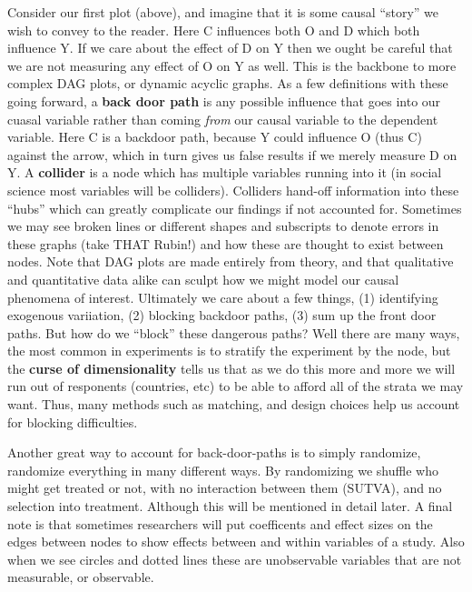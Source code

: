 \documentclass[12pt]{article}\usepackage[]{graphicx}\usepackage[]{color}
\begin{document}
\begin{flushleft}
Consider our first plot (above), and imagine that it is some causal ``story'' we wish to convey to the reader. Here C influences both O and D which both influence Y. If we care about the effect of D on Y then we ought be careful that we are not measuring any effect of O on Y as well. This is the backbone to more complex DAG plots, or dynamic acyclic graphs. As a few definitions with these going forward, a \textbf{back door path} is any possible influence that goes into our cuasal variable rather than coming \textit{from} our causal variable to the dependent variable. Here C is a backdoor path, because Y could influence O (thus C) against the arrow, which in turn gives us false results if we merely measure D on Y. A \textbf{collider} is a node which has multiple variables running into it (in social science most variables will be colliders). Colliders hand-off information into these ``hubs'' which can greatly complicate our findings if not accounted for. Sometimes we may see broken lines or different shapes and subscripts to denote errors in these graphs (take THAT Rubin!) and how these are thought to exist between nodes. Note that DAG plots are made entirely from theory, and that qualitative and quantitative data alike can sculpt how we might model our causal phenomena of interest. Ultimately we care about a few things, (1) identifying exogenous variiation, (2) blocking backdoor paths, (3) sum up the front door paths. But how do we ``block'' these dangerous paths? Well there are many ways, the most common in experiments is to stratify the experiment by the node, but the \textbf{curse of dimensionality} tells us that as we do this more and more we will run out of responents (countries, etc) to be able to afford all of the strata we may want. Thus, many methods such as matching, and design choices help us account for blocking difficulties.    

Another great way to account for back-door-paths is to simply randomize, randomize everything in many different ways. By randomizing we shuffle who might get treated or not, with no interaction between them (SUTVA), and no selection into treatment. Although this will be mentioned in detail later. A final note is that sometimes researchers will put coefficents and effect sizes on the edges between nodes to show effects between and within variables of a study. Also when we see circles and dotted lines these are unobservable variables that are not measurable, or observable.



\end{flushleft}
\end{document}

